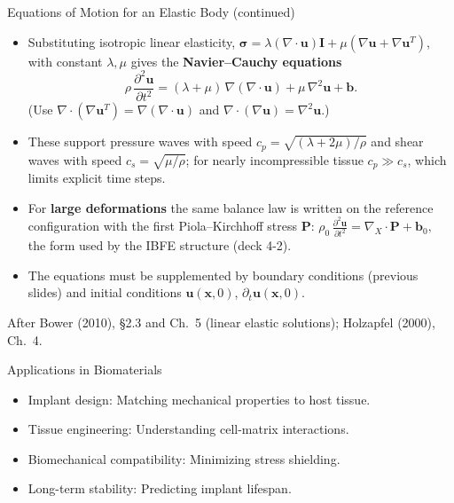 \documentclass[aspectratio=169,11pt]{beamer}
\begin{document}
\begin{frame}{Equations of Motion for an Elastic Body (continued)}
  \begin{itemize}
    \item Substituting isotropic linear elasticity, $\boldsymbol{\sigma} = \lambda(\nabla\cdot\mathbf{u})\mathbf{I} + \mu\left(\nabla\mathbf{u} + \nabla\mathbf{u}^T\right)$, with constant $\lambda,\mu$ gives the \textbf{Navier--Cauchy equations}
      \[
        \rho\,\frac{\partial^2 \mathbf{u}}{\partial t^2} = (\lambda+\mu)\,\nabla(\nabla\cdot\mathbf{u}) + \mu\,\nabla^2\mathbf{u} + \mathbf{b}.
      \]
      (Use $\nabla\cdot(\nabla\mathbf{u}^T) = \nabla(\nabla\cdot\mathbf{u})$ and $\nabla\cdot(\nabla\mathbf{u}) = \nabla^2\mathbf{u}$.)
    \item These support pressure waves with speed $c_p = \sqrt{(\lambda+2\mu)/\rho}$ and shear waves with speed $c_s = \sqrt{\mu/\rho}$; for nearly incompressible tissue $c_p \gg c_s$, which limits explicit time steps.
    \item For \textbf{large deformations} the same balance law is written on the reference configuration with the first Piola--Kirchhoff stress $\mathbf{P}$:
      \(
        \rho_0\,\frac{\partial^2 \mathbf{u}}{\partial t^2} = \nabla_X\cdot\mathbf{P} + \mathbf{b}_0 ,
      \)
      the form used by the IBFE structure (deck 4-2).
    \item The equations must be supplemented by boundary conditions (previous slides) and initial conditions $\mathbf{u}(\mathbf{x},0)$, $\partial_t\mathbf{u}(\mathbf{x},0)$.
  \end{itemize}
  \vspace{1mm}
  {\tiny\color{DarkGray}After Bower (2010), \S2.3 and Ch.~5 (linear elastic solutions); Holzapfel (2000), Ch.~4.\par}
\end{frame}

\begin{frame}{Applications in Biomaterials}
  \begin{itemize}
    \item Implant design: Matching mechanical properties to host tissue.
    \item Tissue engineering: Understanding cell-matrix interactions.
    \item Biomechanical compatibility: Minimizing stress shielding.
    \item Long-term stability: Predicting implant lifespan.
  \end{itemize}
\end{frame}
\end{document}
